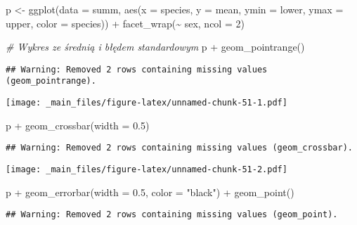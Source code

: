 \documentclass[
]{book}
\newenvironment{Shaded}{\begin{snugshade}}{\end{snugshade}}
\newcommand{\AttributeTok}[1]{\textcolor[rgb]{0.77,0.63,0.00}{#1}}
\newcommand{\CommentTok}[1]{\textcolor[rgb]{0.56,0.35,0.01}{\textit{#1}}}
\newcommand{\DecValTok}[1]{\textcolor[rgb]{0.00,0.00,0.81}{#1}}
\newcommand{\FloatTok}[1]{\textcolor[rgb]{0.00,0.00,0.81}{#1}}
\newcommand{\FunctionTok}[1]{\textcolor[rgb]{0.00,0.00,0.00}{#1}}
\newcommand{\NormalTok}[1]{#1}
\newcommand{\OtherTok}[1]{\textcolor[rgb]{0.56,0.35,0.01}{#1}}
\newcommand{\SpecialCharTok}[1]{\textcolor[rgb]{0.00,0.00,0.00}{#1}}
\newcommand{\StringTok}[1]{\textcolor[rgb]{0.31,0.60,0.02}{#1}}
\begin{document}
\begin{Shaded}
\begin{Highlighting}[]
\NormalTok{p }\OtherTok{\textless{}{-}} \FunctionTok{ggplot}\NormalTok{(}\AttributeTok{data =}\NormalTok{ summ, }\FunctionTok{aes}\NormalTok{(}\AttributeTok{x =}\NormalTok{ species, }\AttributeTok{y =}\NormalTok{ mean, }\AttributeTok{ymin =}\NormalTok{ lower, }\AttributeTok{ymax =}\NormalTok{ upper, }
                             \AttributeTok{color =}\NormalTok{ species)) }\SpecialCharTok{+} \FunctionTok{facet\_wrap}\NormalTok{(}\SpecialCharTok{\textasciitilde{}}\NormalTok{ sex, }\AttributeTok{ncol =} \DecValTok{2}\NormalTok{)}

\CommentTok{\# Wykres ze średnią i błędem standardowym}
\NormalTok{p }\SpecialCharTok{+} \FunctionTok{geom\_pointrange}\NormalTok{()}
\end{Highlighting}
\end{Shaded}

\begin{verbatim}
## Warning: Removed 2 rows containing missing values (geom_pointrange).
\end{verbatim}

\texttt{[image: \_main\_files/figure-latex/unnamed-chunk-51-1.pdf]}

\begin{Shaded}
\begin{Highlighting}[]
\NormalTok{p }\SpecialCharTok{+} \FunctionTok{geom\_crossbar}\NormalTok{(}\AttributeTok{width =} \FloatTok{0.5}\NormalTok{)}
\end{Highlighting}
\end{Shaded}

\begin{verbatim}
## Warning: Removed 2 rows containing missing values (geom_crossbar).
\end{verbatim}

\texttt{[image: \_main\_files/figure-latex/unnamed-chunk-51-2.pdf]}

\begin{Shaded}
\begin{Highlighting}[]
\NormalTok{p }\SpecialCharTok{+} \FunctionTok{geom\_errorbar}\NormalTok{(}\AttributeTok{width =} \FloatTok{0.5}\NormalTok{, }\AttributeTok{color =} \StringTok{"black"}\NormalTok{) }\SpecialCharTok{+} \FunctionTok{geom\_point}\NormalTok{()}
\end{Highlighting}
\end{Shaded}

\begin{verbatim}
## Warning: Removed 2 rows containing missing values (geom_point).
\end{verbatim}
\end{document}
